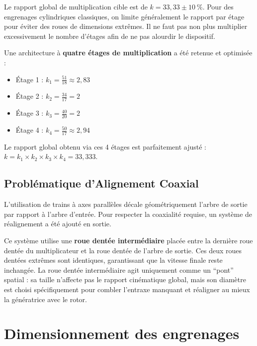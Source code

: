 \documentclass[11pt,a4paper]{article}
\begin{document}
Le rapport global de multiplication cible est de $k = 33{,}33 \pm \qty{10}{\percent}$. Pour des engrenages cylindriques classiques, on limite généralement le rapport par étage pour éviter des roues de dimensions extrêmes. Il ne faut pas non plus multiplier excessivement le nombre d'étages afin de ne pas alourdir le dispositif.

Une architecture à \textbf{quatre étages de multiplication} a été retenue et optimisée :
\begin{itemize}
    \item Étage 1 : $k_1 = \frac{51}{18} \approx 2{,}83$
    \item Étage 2 : $k_2 = \frac{34}{17} = 2$
    \item Étage 3 : $k_3 = \frac{40}{20} = 2$
    \item Étage 4 : $k_4 = \frac{50}{17} \approx 2{,}94$
\end{itemize}

Le rapport global obtenu via ces 4 étages est parfaitement ajusté : $k = k_1 \times k_2 \times k_3 \times k_4 = 33{,}333$.

\subsection{Problématique d'Alignement Coaxial}

L'utilisation de trains à axes parallèles décale géométriquement l'arbre de sortie par rapport à l'arbre d'entrée. Pour respecter la coaxialité requise, un système de réalignement a été ajouté en sortie.

Ce système utilise une \textbf{roue dentée intermédiaire} placée entre la dernière roue dentée du multiplicateur et la roue dentée de l'arbre de sortie. 
Ces deux roues dentées extrêmes sont identiques, garantissant que la vitesse finale reste inchangée. La roue dentée intermédiaire agit uniquement comme un \enquote{pont} spatial : sa taille n'affecte pas le rapport cinématique global, mais son diamètre est choisi spécifiquement pour combler l'entraxe manquant et réaligner au mieux la génératrice avec le rotor.

\section{Dimensionnement des engrenages}
\end{document}
